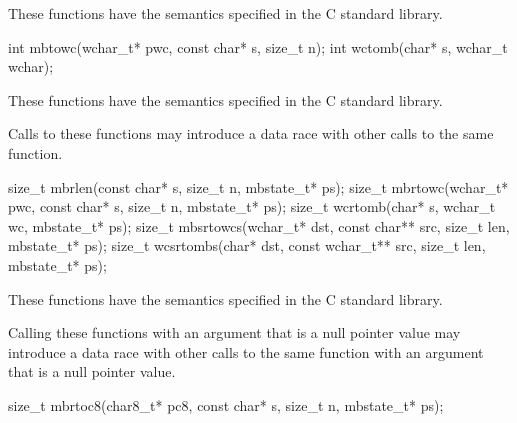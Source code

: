 \begin{itemdescr}
\pnum
\effects
These functions have the semantics specified in the C standard library.
\end{itemdescr}


%
%
\begin{itemdecl}
int mbtowc(wchar_t* pwc, const char* s, size_t n);
int wctomb(char* s, wchar_t wchar);
\end{itemdecl}

\begin{itemdescr}
\pnum
\effects
These functions have the semantics specified in the C standard library.

\pnum
\remarks
Calls to these functions
may introduce a data race
with other calls to the same function.
\end{itemdescr}


%
%
%
%
%
\begin{itemdecl}
size_t mbrlen(const char* s, size_t n, mbstate_t* ps);
size_t mbrtowc(wchar_t* pwc, const char* s, size_t n, mbstate_t* ps);
size_t wcrtomb(char* s, wchar_t wc, mbstate_t* ps);
size_t mbsrtowcs(wchar_t* dst, const char** src, size_t len, mbstate_t* ps);
size_t wcsrtombs(char* dst, const wchar_t** src, size_t len, mbstate_t* ps);
\end{itemdecl}

\begin{itemdescr}
\pnum
\effects
These functions have the semantics specified in the C standard library.

\pnum
\remarks
Calling these functions
with an  argument that is a null pointer value
may introduce a data race
with other calls to the same function
with an  argument that is a null pointer value.
\end{itemdescr}


%
\begin{itemdecl}
size_t mbrtoc8(char8_t* pc8, const char* s, size_t n, mbstate_t* ps);
\end{itemdecl}

